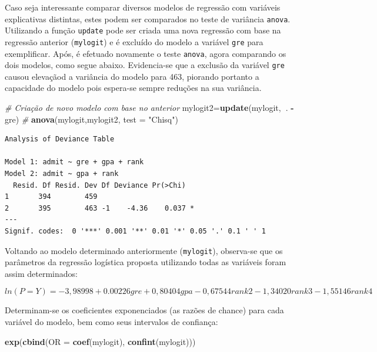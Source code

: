 \documentclass[12pt,brazil,oneside]{book}
\newenvironment{Shaded}{\begin{snugshade}}{\end{snugshade}}
\newcommand{\CommentTok}[1]{\textcolor[rgb]{0.56,0.35,0.01}{\textit{#1}}}
\newcommand{\DataTypeTok}[1]{\textcolor[rgb]{0.13,0.29,0.53}{#1}}
\newcommand{\KeywordTok}[1]{\textcolor[rgb]{0.13,0.29,0.53}{\textbf{#1}}}
\newcommand{\NormalTok}[1]{#1}
\newcommand{\OperatorTok}[1]{\textcolor[rgb]{0.81,0.36,0.00}{\textbf{#1}}}
\newcommand{\StringTok}[1]{\textcolor[rgb]{0.31,0.60,0.02}{#1}}
\begin{document}
Caso seja interessante comparar diversos modelos de regressão com variáveis explicativas distintas, estes podem ser comparados no teste de variância \texttt{anova}. Utilizando a função \texttt{update} pode ser criada uma nova regressão com base na regressão anterior (\texttt{mylogit}) e é excluído do modelo a variável \texttt{gre} para exemplificar. Após, é efetuado novamente o teste \texttt{anova}, agora comparando os dois modelos, como segue abaixo. Evidencia-se que a exclusão da variável \texttt{gre} causou elevaçãod a variância do modelo para 463, piorando portanto a capacidade do modelo pois espera-se sempre reduções na sua variância.

\begin{Shaded}
\begin{Highlighting}[]
\CommentTok{# Criação de novo modelo com base no anterior}
\NormalTok{mylogit2=}\KeywordTok{update}\NormalTok{(mylogit,}\OperatorTok{~}\NormalTok{. }\OperatorTok{-}\StringTok{ }\NormalTok{gre)}
\CommentTok{# }
\KeywordTok{anova}\NormalTok{(mylogit,mylogit2, }\DataTypeTok{test =} \StringTok{"Chisq"}\NormalTok{)}
\end{Highlighting}
\end{Shaded}

\begin{verbatim}
Analysis of Deviance Table

Model 1: admit ~ gre + gpa + rank
Model 2: admit ~ gpa + rank
  Resid. Df Resid. Dev Df Deviance Pr(>Chi)  
1       394        459                       
2       395        463 -1    -4.36    0.037 *
---
Signif. codes:  0 '***' 0.001 '**' 0.01 '*' 0.05 '.' 0.1 ' ' 1
\end{verbatim}

Voltando ao modelo determinado anteriormente (\texttt{mylogit}), observa-se que os parâmetros da regressão logística proposta utilizando todas as variáveis foram assim determinados:

\[
ln(P=Y) = 
-3,98998 + 0.00226gre + 0,80404gpa -0,67544rank2 -1,34020rank3 -1,55146rank4
\]

Determinam-se os coeficientes exponenciados (as razões de chance) para cada variável do modelo, bem como seus intervalos de confiança:

\begin{Shaded}
\begin{Highlighting}[]
\KeywordTok{exp}\NormalTok{(}\KeywordTok{cbind}\NormalTok{(}\DataTypeTok{OR =} \KeywordTok{coef}\NormalTok{(mylogit), }\KeywordTok{confint}\NormalTok{(mylogit)))}
\end{Highlighting}
\end{Shaded}
\end{document}
